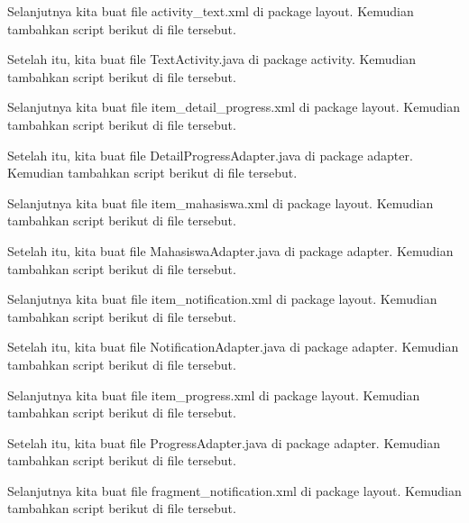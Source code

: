 Selanjutnya kita buat file activity\_text.xml di package layout. Kemudian tambahkan script berikut di file tersebut.


Setelah itu, kita buat file TextActivity.java di package activity. Kemudian tambahkan script berikut di file tersebut.


Selanjutnya kita buat file item\_detail\_progress.xml di package layout. Kemudian tambahkan script berikut di file tersebut.


Setelah itu, kita buat file DetailProgressAdapter.java di package adapter. Kemudian tambahkan script berikut di file tersebut.


Selanjutnya kita buat file item\_mahasiswa.xml di package layout. Kemudian tambahkan script berikut di file tersebut.


Setelah itu, kita buat file MahasiswaAdapter.java di package adapter. Kemudian tambahkan script berikut di file tersebut.


Selanjutnya kita buat file item\_notification.xml di package layout. Kemudian tambahkan script berikut di file tersebut.


Setelah itu, kita buat file NotificationAdapter.java di package adapter. Kemudian tambahkan script berikut di file tersebut.


Selanjutnya kita buat file item\_progress.xml di package layout. Kemudian tambahkan script berikut di file tersebut.


Setelah itu, kita buat file ProgressAdapter.java di package adapter. Kemudian tambahkan script berikut di file tersebut.


Selanjutnya kita buat file fragment\_notification.xml di package layout. Kemudian tambahkan script berikut di file tersebut.


